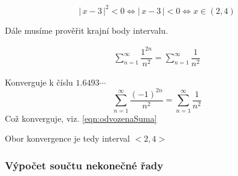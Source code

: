 \begin{displaymath}
\big |\,x-3\,\big |^{2} < 0\Leftrightarrow \big |\,x-3\,\big | < 0 \Leftrightarrow x \in (2, 4)
\end{displaymath}

\noindent Dále musíme prověřit krajní body intervalu.

\begin{eqnarray}
\sum_{n=1}^{\infty} \dfrac{1^{2n}}{n^2} = \sum_{n=1}^{\infty} \dfrac{1}{n^2}
\label{eqn:odvozenaSuma}
\end{eqnarray}

\noindent Konverguje k číslu $1.6493\cdots$
\begin{displaymath}
\sum_{n=1}^{\infty} \dfrac{(-1)^{2n}}{n^2} = \sum_{n=1}^{\infty} \dfrac{1}{n^2}
\end{displaymath}
\noindent Což konverguje, viz. \ref{eqn:odvozenaSuma}

\noindent Obor konvergence je tedy interval $<2, 4>$

\subsubsection{Výpočet součtu nekonečné řady}


